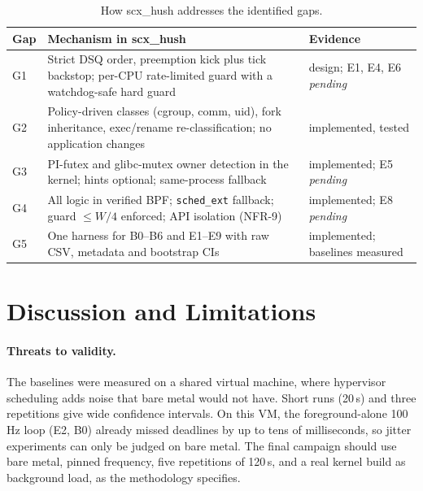 \documentclass[11pt,a4paper]{article}
\newcommand{\code}[1]{\texttt{#1}}
\newcommand{\pending}{\textit{pending}}
\begin{document}
\begin{table}[h]
\centering\small
\caption{How scx\_hush addresses the identified gaps.}
\label{tab:gapmap}
\begin{tabularx}{\linewidth}{@{}lXl@{}}
\toprule
Gap & Mechanism in scx\_hush & Evidence \\
\midrule
G1 & Strict DSQ order, preemption kick plus tick backstop; per-CPU rate-limited guard with a watchdog-safe hard guard & design; E1, E4, E6 \pending \\
G2 & Policy-driven classes (cgroup, comm, uid), fork inheritance, exec/rename re-classification; no application changes & implemented, tested \\
G3 & PI-futex and glibc-mutex owner detection in the kernel; hints optional; same-process fallback & implemented; E5 \pending \\
G4 & All logic in verified BPF; \code{sched\_ext} fallback; guard $\le W/4$ enforced; API isolation (NFR-9) & implemented; E8 \pending \\
G5 & One harness for B0--B6 and E1--E9 with raw CSV, metadata and bootstrap CIs & implemented; baselines measured \\
\bottomrule
\end{tabularx}
\end{table}

\section{Discussion and Limitations}
\label{sec:discussion}

\paragraph{Threats to validity.}
The baselines were measured on a shared virtual machine, where hypervisor
scheduling adds noise that bare metal would not have. Short runs (20\,s) and
three repetitions give wide confidence intervals. On this VM, the foreground-alone 100\,Hz loop (E2, B0) already
missed deadlines by up to tens of milliseconds, so jitter experiments can only
be judged on bare metal. The final campaign should
use bare metal, pinned frequency, five repetitions of 120\,s, and a real
kernel build as background load, as the methodology specifies.
\end{document}
